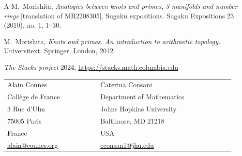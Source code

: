 \documentclass[letterpaper,11pt]{article}
\theoremstyle{plain}
\begin{document}
\begin{thebibliography}{A}
 M.~Morishita, {\em Analogies between knots and primes, 3-manifolds and number rings} [translation of MR2208305]. Sugaku expositions. Sugaku Expositions 23 (2010), no. 1, 1--30.

 M.~Morishita, {\em Knots and primes. An introduction to arithmetic topology}. Universitext. Springer, London, 2012.

   \emph{The Stacks project} 2024,  \url{https://stacks.math.columbia.edu} 

\end{thebibliography}









\vspace{20pt}
\small
\noindent


\begin{tabular}{ l l l l l l l l l l l l l}
 Alain Connes &&&&&&  Caterina Consani  &&&&&&  ~\\ 
 Coll\`ege de France &&&&&&  Department of Mathematics  &&&&&&  ~\\  3 Rue d'Ulm &&&&&&  Johns Hopkins University  &&&&&& ~\\
 75005 Paris &&&&&&  Baltimore, MD 21218 &&&&&&  ~\\
 France &&&&&&  USA &&&&&&  ~\\
 \href{mailto:alain@connes.org}{alain@connes.org} &&&&&&  \href{mailto:cconsan1@jhu.edu}{cconsan1@jhu.edu}&&&&&&  ~
\end{tabular}
\end{document}
